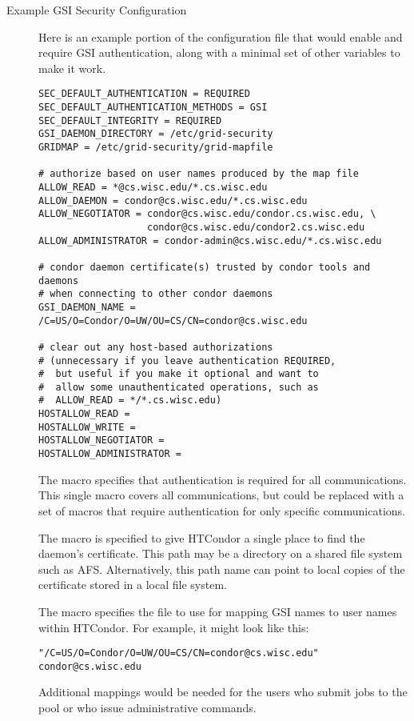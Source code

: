 \begin{description}
\item[Example GSI Security Configuration]

Here is an example portion of the configuration file that would
enable and require GSI authentication,
along with a minimal set of other variables to make it work. 

\footnotesize
\begin{verbatim}
SEC_DEFAULT_AUTHENTICATION = REQUIRED
SEC_DEFAULT_AUTHENTICATION_METHODS = GSI
SEC_DEFAULT_INTEGRITY = REQUIRED
GSI_DAEMON_DIRECTORY = /etc/grid-security
GRIDMAP = /etc/grid-security/grid-mapfile

# authorize based on user names produced by the map file
ALLOW_READ = *@cs.wisc.edu/*.cs.wisc.edu
ALLOW_DAEMON = condor@cs.wisc.edu/*.cs.wisc.edu
ALLOW_NEGOTIATOR = condor@cs.wisc.edu/condor.cs.wisc.edu, \
                   condor@cs.wisc.edu/condor2.cs.wisc.edu
ALLOW_ADMINISTRATOR = condor-admin@cs.wisc.edu/*.cs.wisc.edu

# condor daemon certificate(s) trusted by condor tools and daemons
# when connecting to other condor daemons
GSI_DAEMON_NAME = /C=US/O=Condor/O=UW/OU=CS/CN=condor@cs.wisc.edu

# clear out any host-based authorizations
# (unnecessary if you leave authentication REQUIRED,
#  but useful if you make it optional and want to
#  allow some unauthenticated operations, such as
#  ALLOW_READ = */*.cs.wisc.edu)
HOSTALLOW_READ =
HOSTALLOW_WRITE =
HOSTALLOW_NEGOTIATOR =
HOSTALLOW_ADMINISTRATOR =
\end{verbatim}
\normalsize

The
 macro specifies that
authentication is required for all communications.
This single macro covers all communications, but could be
replaced with a set of macros that require authentication for
only specific communications.

The macro  is specified
to give
HTCondor a single place to find the daemon's certificate.
This path may be a directory on a shared file system such as AFS. 
Alternatively, this path name can point to 
local copies of the certificate stored
in a local file system.

The macro  specifies the file
to use for mapping GSI names to user names within HTCondor.  For example,
it might look like this:

\footnotesize
\begin{verbatim}
"/C=US/O=Condor/O=UW/OU=CS/CN=condor@cs.wisc.edu" condor@cs.wisc.edu
\end{verbatim}
\normalsize

Additional mappings would be needed for the users who submit jobs to
the pool or who issue administrative commands.

\end{description}


